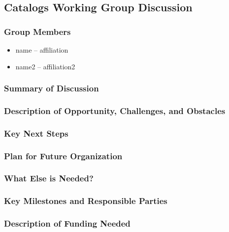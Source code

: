 \subsection{Catalogs Working Group Discussion}
\label{sec:appendix_catalogs}


\subsubsection{Group Members}

\begin{itemize}
\item name -- affiliation
\item name2 -- affiliation2
\end{itemize}

\subsubsection{Summary of Discussion}

\subsubsection{Description of Opportunity, Challenges, and Obstacles}


\subsubsection{Key Next Steps}


\subsubsection{Plan for Future Organization}


\subsubsection{What Else is Needed?}


\subsubsection{Key Milestones and Responsible Parties}


\subsubsection{Description of Funding Needed}
